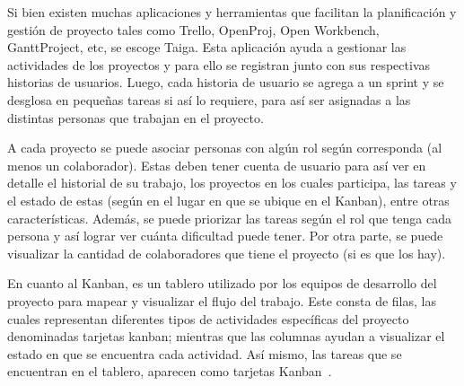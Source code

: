 Si bien existen muchas aplicaciones y herramientas que facilitan la planificación y gestión de proyecto tales como Trello, OpenProj, Open Workbench, GanttProject, etc, se escoge Taiga. Esta aplicación ayuda a gestionar las actividades de los proyectos y para ello se registran junto con sus respectivas historias de usuarios. Luego, cada historia de usuario se agrega a un sprint y se desglosa en pequeñas tareas si así lo requiere, para así ser asignadas a las distintas personas que trabajan en el proyecto.

A cada proyecto se puede asociar personas con algún rol según corresponda (al menos un colaborador). Estas deben tener cuenta de usuario para así ver en detalle el historial de su trabajo, los proyectos en los cuales participa, las tareas y el estado de estas (según en el lugar en que se ubique en el Kanban), entre otras características. Además, se puede priorizar las tareas según el rol que tenga cada persona y así lograr ver cuánta dificultad puede tener. Por otra parte, se puede visualizar la cantidad de colaboradores que tiene el proyecto (si es que los hay).

En cuanto al Kanban, es un tablero utilizado por los equipos de desarrollo del proyecto para mapear y visualizar el flujo del trabajo. Este consta de filas, las cuales representan diferentes tipos de actividades específicas del proyecto denominadas tarjetas kanban; mientras que las columnas ayudan a visualizar el estado en que se encuentra cada actividad. Así mismo, las tareas que se encuentran en el tablero, aparecen como tarjetas Kanban~\cite{19}.

